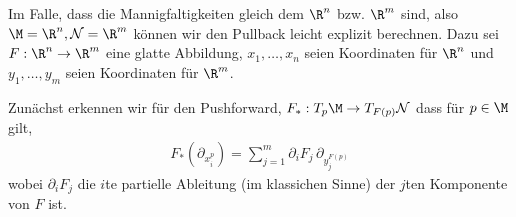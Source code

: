 \documentclass[letterpaper,10pt,english]{jupyterBook}
\begin{document}
\sphinxAtStartPar
Im Falle, dass die Mannigfaltigkeiten gleich dem \(\R^n\) bzw. \(\R^m\) sind, also \(\M=\R^n, \mathcal{N}=\R^m\) können wir den Pullback leicht explizit berechnen. Dazu sei \(F:\R^n\to\R^m\) eine glatte Abbildung, \(x_1,\ldots,x_n\) seien Koordinaten für \(\R^n\) und \(y_1,\ldots,y_m\) seien Koordinaten für \(\R^m\).

\sphinxAtStartPar
Zunächst erkennen wir für den Pushforward, \(F_\ast:T_p\M\to T_{F(p)}\mathcal{N}\) dass für \(p\in\M\) gilt,
\begin{equation*}
\begin{split}F_\ast(\partial_{x_i^p}) = \sum_{j=1}^m \partial_i F_j\, \partial_{y_j^{F(p)}}\end{split}
\end{equation*}
\sphinxAtStartPar
wobei \(\partial_i F_j\) die \(i\)\sphinxhyphen{}te partielle Ableitung (im klassichen Sinne) der \(j\)\sphinxhyphen{}ten Komponente von \(F\) ist.
\end{document}
